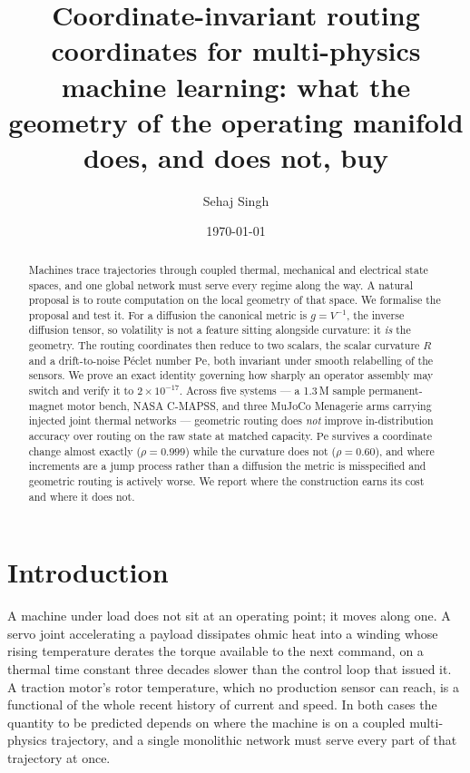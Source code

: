 \documentclass[11pt]{article}
\title{\bf Coordinate-invariant routing coordinates for multi-physics machine
learning: what the geometry of the operating manifold does, and does not, buy}
\author{Sehaj Singh}
\date{\today}
\newcommand{\Pen}{\mathrm{Pe}}
\begin{document}
\maketitle

\begin{abstract}
\noindent
Machines trace trajectories through coupled thermal, mechanical and electrical
state spaces, and one global network must serve every regime along the way. A
natural proposal is to route computation on the local geometry of that space.
We formalise the proposal and test it. For a diffusion the canonical metric is
$g=V^{-1}$, the inverse diffusion tensor, so volatility is not a feature
sitting alongside curvature: it \emph{is} the geometry. The routing coordinates
then reduce to two scalars, the scalar curvature $R$ and a drift-to-noise
P\'eclet number $\Pen$, both invariant under smooth relabelling of the sensors.
We prove an exact identity governing how sharply an operator assembly may
switch and verify it to $2\times10^{-17}$. Across five systems --- a 1.3\,M
sample permanent-magnet motor bench, NASA C-MAPSS, and three MuJoCo Menagerie
arms carrying injected joint thermal networks --- geometric routing does
\emph{not} improve in-distribution accuracy over routing on the raw state at
matched capacity. $\Pen$ survives a coordinate change almost exactly
($\rho=0.999$) while the curvature does not ($\rho=0.60$), and where increments
are a jump process rather than a diffusion the metric is misspecified and
geometric routing is actively worse. We report where the construction earns its
cost and where it does not.
\end{abstract}

\section{Introduction}

A machine under load does not sit at an operating point; it moves along one.
A servo joint accelerating a payload dissipates ohmic heat into a winding whose
rising temperature derates the torque available to the next command, on a
thermal time constant three decades slower than the control loop that issued
it. A traction motor's rotor temperature, which no production sensor can reach,
is a functional of the whole recent history of current and speed. In both
cases the quantity to be predicted depends on where the machine is on a coupled
multi-physics trajectory, and a single monolithic network must serve every part
of that trajectory at once.
\end{document}
